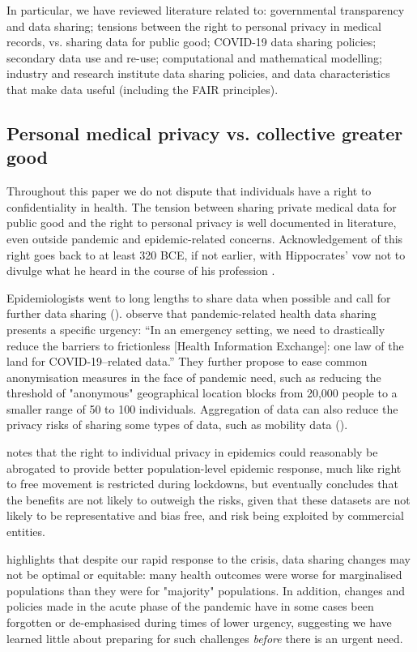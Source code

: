 \documentclass{CUP-JNL-DAP}%
\begin{document}
In particular, we have reviewed literature related to: governmental transparency and data sharing; tensions between the right to personal privacy in medical records, vs. sharing data for public good; COVID-19 data sharing policies; secondary data use and re-use; computational and mathematical modelling; industry and research institute data sharing policies, and data characteristics that make data useful (including the FAIR principles). 

\subsection{Personal medical privacy vs. collective greater good} 
Throughout this paper we do not dispute that individuals have a right to confidentiality in health. The tension between sharing private medical data for public good and the right to personal privacy is well documented in literature, even outside pandemic and epidemic-related concerns. Acknowledgement of this right goes back to at least 320 BCE, if not earlier, with Hippocrates' vow not to divulge what he heard in the course of his profession \cite{jones_hippocrates}.  

Epidemiologists went to long lengths to share data when possible and call for further data sharing (\cite{xu_open_2020}). \cite{Leslie_McSwain} observe that pandemic-related health data sharing presents a specific urgency: \enquote{In an emergency setting, we need to drastically reduce the barriers to frictionless [Health Information Exchange]: one law of the land for COVID-19–related data.} They further propose to ease common anonymisation measures in the face of pandemic need, such as reducing the threshold of "anonymous" geographical location blocks from 20,000 people to a smaller range of 50 to 100 individuals. Aggregation of data can also reduce the privacy risks of sharing some types of data, such as mobility data (\cite{buckee_aggregated_2020}). 

\cite{henderson_patient_2021} notes that the right to individual privacy in epidemics could reasonably be abrogated to provide better population-level epidemic response, much like right to free movement is restricted during lockdowns, but eventually concludes that the benefits are not likely to outweigh the risks, given that these datasets are not likely to be representative and bias free, and risk being exploited by commercial entities.  

\cite{dron_data_2022} highlights that despite our rapid response to the crisis, data sharing changes may not be optimal or equitable: many health outcomes were worse for marginalised populations than they were for "majority" populations. In addition, changes and policies made in the acute phase of the pandemic have in some cases been forgotten or de-emphasised during times of lower urgency, suggesting we have learned little about preparing for such challenges \textit{before} there is an urgent need.   
\end{document}
